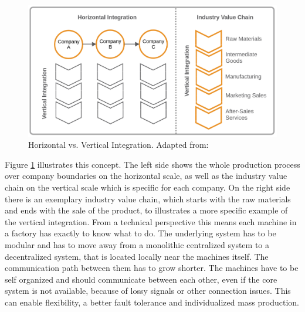 \begin{figure}[H]
    \centering
    \includegraphics[width=\textwidth]{resources/images/vertical_horizontal_integration.png}
    \caption[Horizontal vs. Vertical Integration]{Horizontal vs. Vertical Integration. Adapted from: \autocite{Jur:2013}}
    \label{fig:vertical_horizontal_integration}
\end{figure}

Figure \ref{fig:vertical_horizontal_integration} illustrates this concept.
The left side shows the whole production process over company boundaries on the horizontal scale, as well as the industry value chain on the vertical scale which is specific for each company.
On the right side there is an exemplary industry value chain, which starts with the raw materials and ends with the sale of the product, to illustrates a more specific example of the vertical integration.
From a technical perspective this means each machine in a factory has exactly to know what to do.
The underlying system has to be modular and has to move away from a monolithic centralized system to a decentralized system, that is located locally near the machines itself.\autocite[cf.][p. 380]{Pahl:2015}
The communication path between them has to grow shorter.
The machines have to be self organized and should communicate between each other, even if the core system is not available, because of lossy signals or other connection issues.
This can enable flexibility, a better fault tolerance and individualized mass production.\autocite[cf.]{Lyd:2016}


